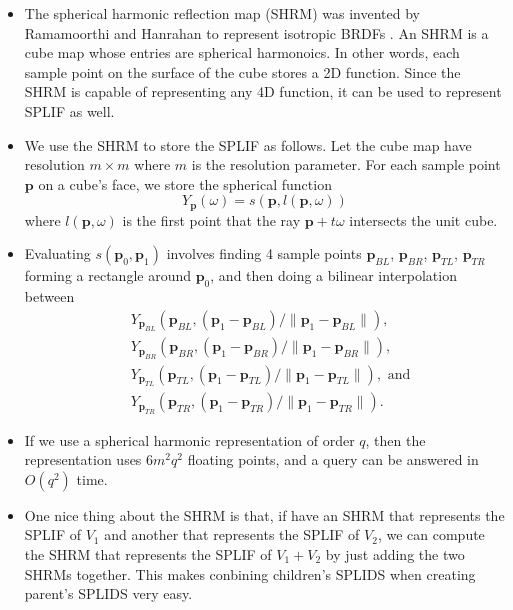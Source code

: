 \documentclass[10pt]{article}
\begin{document}
\begin{itemize}
    \item The spherical harmonic reflection map (SHRM)
        was invented by Ramamoorthi and Hanrahan to
        represent isotropic BRDFs \cite{shrm}. 
        An SHRM is a cube map whose entries are 
        spherical harmonoics. In other words, 
        each sample point on the surface of the
        cube stores a 2D function. Since the SHRM
        is capable of representing any 4D function, it
        can be used to represent SPLIF as well.
        
    \item We use the SHRM to store the SPLIF as follows.
        Let the cube map have resolution $m \times m$
        where $m$ is the resolution parameter. For each
        sample point $\mathbf{p}$ on a cube's face,
        we store the spherical function
        $$Y_{\mathbf{p}}(\omega) = s(\mathbf{p}, l(\mathbf{p}, \omega))$$
        where $l(\mathbf{p},\omega)$ is the first point
        that the ray $\mathbf{p} + t\omega$ intersects
        the unit cube. 
    
    \item Evaluating $s(\mathbf{p}_0, \mathbf{p}_1)$ involves
        finding 4 sample points $\mathbf{p}_{BL}$,
        $\mathbf{p}_{BR}$, $\mathbf{p}_{TL}$, $\mathbf{p}_{TR}$
        forming a rectangle around $\mathbf{p}_0$, and then
        doing a bilinear interpolation between
        \begin{align*}
            &Y_{\mathbf{p}_{BL}}(\mathbf{p}_{BL}, (\mathbf{p}_1 - \mathbf{p}_{BL})/\| \mathbf{p}_1 - \mathbf{p}_{BL} \|),\\
            &Y_{\mathbf{p}_{BR}}(\mathbf{p}_{BR}, (\mathbf{p}_1 - \mathbf{p}_{BR})/\| \mathbf{p}_1 - \mathbf{p}_{BR} \|),\\
            &Y_{\mathbf{p}_{TL}}(\mathbf{p}_{TL}, (\mathbf{p}_1 - \mathbf{p}_{TL})/\| \mathbf{p}_1 - \mathbf{p}_{TL} \|), \mbox{ and}\\
            &Y_{\mathbf{p}_{TR}}(\mathbf{p}_{TR}, (\mathbf{p}_1 - \mathbf{p}_{TR})/\| \mathbf{p}_1 - \mathbf{p}_{TR} \|).
        \end{align*}
        
    \item If we use a spherical harmonic representation of order
        $q$, then the representation uses $6m^2 q^2$ floating points,
        and a query can be answered in $O(q^2)$ time.
        
    \item One nice thing about the SHRM is that, if have
        an SHRM that represents the SPLIF of $V_1$ and
        another that represents the SPLIF of $V_2$,
        we can compute the SHRM that represents the 
        SPLIF of $V_1 + V_2$ by just adding the two SHRMs together.
        This makes conbining children's SPLIDS when creating
        parent's SPLIDS very easy.
        

\end{itemize}
\end{document}
